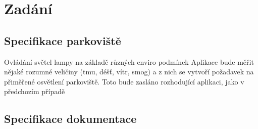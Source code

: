 \chapter{Zadání} 
\label{sec:Zadani}
\section{Specifikace parkoviště}
Ovládání světel lampy na základě různých enviro podmínek
Aplikace bude měřit nějaké rozumné veličiny (tmu, déšť, vítr, smog) a z nich se
vytvoří požadavek na přiměřené osvětlení parkoviště. Toto bude zasláno rozhodující
aplikaci, jako v předchozím případě

\section{Specifikace dokumentace}
